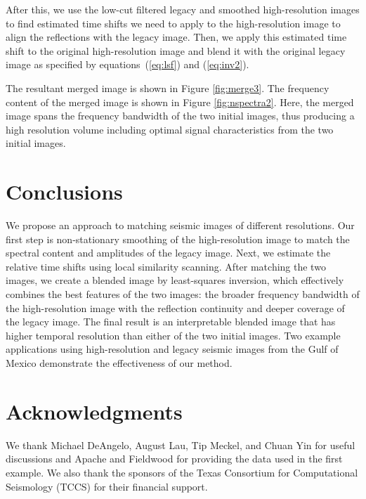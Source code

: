     After this, we use the low-cut filtered legacy and smoothed high-resolution images to find estimated time shifts we need to apply to the high-resolution image to align the reflections with the legacy image. 
    Then, we apply this estimated time shift to the original high-resolution image and blend it with the original legacy image as specified by equations~(\ref{eq:lsf}) and (\ref{eq:inv2}).
    
    The resultant merged image is shown in Figure \ref{fig:merge3}. 
    The frequency content of the merged image is shown in Figure \ref{fig:nspectra2}. 
    Here, the merged image spans the frequency bandwidth of the two initial images, thus producing a high resolution volume including optimal signal characteristics from the two initial images.
    
    

\section{Conclusions}
    
    We propose an approach to matching seismic images of different resolutions. 
    Our first step is non-stationary smoothing of the high-resolution image to match the spectral content and amplitudes of the legacy image. 
    Next, we estimate the relative time shifts using local similarity scanning. After matching the two images, we create a blended image by least-squares inversion, which effectively combines the best features of the two images: the broader frequency bandwidth of the high-resolution image with the reflection continuity and deeper coverage of the legacy image. 
    The final result is an interpretable blended image that has higher temporal resolution than either of the two initial images. 
    Two example applications using high-resolution and legacy seismic images from the Gulf of Mexico demonstrate the effectiveness of our method.
    
\section{Acknowledgments}

    We thank Michael DeAngelo, August Lau, Tip Meckel, and Chuan Yin for useful discussions and Apache and Fieldwood for providing the data used in the first example. 
    We also thank the sponsors of the Texas Consortium for Computational Seismology (TCCS) for their financial support. 

%
%
%
